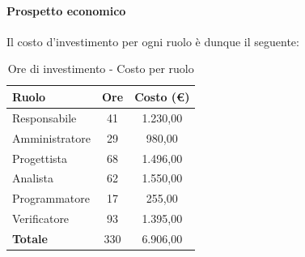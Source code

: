 \documentclass[../PianoProgetto.tex]{subfiles}
\begin{document}
	\paragraph{Prospetto economico}
					Il costo d'investimento per ogni ruolo è dunque il seguente:
	\begin{table}[h]
		\centering
		\begin{tabular}{l * {2}{c}}
			\toprule
			\textbf{Ruolo} & \textbf{Ore} & \textbf{Costo (\euro{})} \\
			\midrule
			Responsabile &	41 &  1.230,00 \\
			Amministratore & 29 & 980,00 \\
			Progettista & 68 & 1.496,00 \\
			Analista & 62 & 1.550,00 \\
			Programmatore & 17 & 255,00 \\
			Verificatore & 93 & 1.395,00 \\
			\midrule		
			\textbf{Totale} & 330 & 6.906,00 \\
			\bottomrule
		\end{tabular}
		\caption{Ore di investimento - Costo per ruolo}
		\label{tab:investimento_costo}
	\end{table}
\vfill	
	
\end{document}
